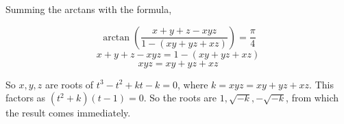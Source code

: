 Summing the arctans with the formula,

$$\arctan\left(\frac{x+y+z-xyz}{1-(xy+yz+xz)}\right)=\frac{\pi}{4}$$
$$x+y+z-xyz=1-(xy+yz+xz)$$
$$xyz=xy+yz+xz$$

So $x,y,z$ are roots of $t^3-t^2+kt-k=0$, where $k=xyz=xy+yz+xz$. This factors
as $(t^2+k)(t-1)=0$. So the roots are $1, \sqrt{-k}, -\sqrt{-k}$, from which the
result comes immediately.
